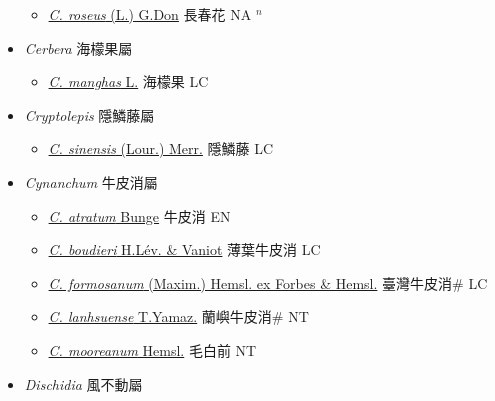\begin{itemize}
  \begin{itemize}
        \item[] \href{http://www.theplantlist.org/tpl1.1/search?q=Catharanthus+roseus}{\textit{C. roseus} (L.) G.Don}   長春花 NA $^n$
  \end{itemize}
 \item[] \textit{Cerbera} 海檬果屬
                    
  \begin{itemize}
        \item[] \href{http://www.theplantlist.org/tpl1.1/search?q=Cerbera+manghas}{\textit{C. manghas} L.}   海檬果 LC
  \end{itemize}
 \item[] \textit{Cryptolepis} 隱鱗藤屬
                    
  \begin{itemize}
        \item[] \href{http://www.theplantlist.org/tpl1.1/search?q=Cryptolepis+sinensis}{\textit{C. sinensis} (Lour.) Merr.}   隱鱗藤 LC
  \end{itemize}
 \item[] \textit{Cynanchum} 牛皮消屬
                    
  \begin{itemize}
        \item[] \href{http://www.theplantlist.org/tpl1.1/search?q=Cynanchum+atratum}{\textit{C. atratum} Bunge}   牛皮消 EN
        \item[] \href{http://www.theplantlist.org/tpl1.1/search?q=Cynanchum+boudieri}{\textit{C. boudieri} H.Lév. \& Vaniot}   薄葉牛皮消 LC
        \item[] \href{http://www.theplantlist.org/tpl1.1/search?q=Cynanchum+formosanum}{\textit{C. formosanum} (Maxim.) Hemsl. ex Forbes \& Hemsl.}   臺灣牛皮消\# LC
        \item[] \href{http://www.theplantlist.org/tpl1.1/search?q=Cynanchum+lanhsuense}{\textit{C. lanhsuense} T.Yamaz.}   蘭嶼牛皮消\# NT
        \item[] \href{http://www.theplantlist.org/tpl1.1/search?q=Cynanchum+mooreanum}{\textit{C. mooreanum} Hemsl.}   毛白前 NT
  \end{itemize}
 \item[] \textit{Dischidia} 風不動屬
                    

\end{itemize}

